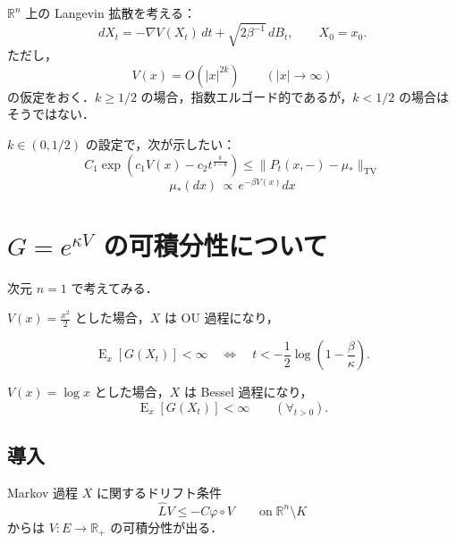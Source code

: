 \documentclass[
]{article}
\author{司馬 博文}
\date{7/05/2024}
\begin{document}
\maketitle

\(\mathbb{R}^n\) 上の Langevin 拡散を考える： \[
dX_t=-\nabla V(X_t)\,dt+\sqrt{2\beta^{-1}}\,dB_t,\qquad X_0=x_0.
\] ただし， \[
V(x)=O(\lvert x\rvert^{2k})\qquad(\lvert x\rvert\to\infty)
\] の仮定をおく．\(k\ge1/2\) の場合，指数エルゴード的であるが，\(k<1/2\)
の場合はそうではない．

\(k\in(0,1/2)\) の設定で，次が示したい： \[
C_1\exp\left(c_1V(x)-c_2t^{\frac{k}{1-k}}\right)\le\|P_t(x,-)-\mu_*\|_\mathrm{TV}
\] \[
\mu_*(dx)\,\propto\,e^{-\beta V(x)}dx
\]

\section{\texorpdfstring{\(G=e^{\kappa V}\)
の可積分性について}{G=e\^{}\{\textbackslash kappa V\} の可積分性について}}\label{gekappa-v-ux306eux53efux7a4dux5206ux6027ux306bux3064ux3044ux3066}

\begin{tcolorbox}[enhanced jigsaw, colback=white, breakable, left=2mm, arc=.35mm, colframe=quarto-callout-tip-color-frame, leftrule=.75mm, bottomrule=.15mm, rightrule=.15mm, opacityback=0, toprule=.15mm]

次元 \(n=1\) で考えてみる．

\(V(x)=\frac{x^2}{2}\) とした場合，\(X\) は OU 過程になり，

\[
\operatorname{E}_x[G(X_t)]<\infty\quad\Leftrightarrow\quad t<-\frac{1}{2}\log\left(1-\frac{\beta}{\kappa}\right).
\]

\(V(x)=\log x\) とした場合，\(X\) は Bessel 過程になり， \[
\operatorname{E}_x[G(X_t)]<\infty\qquad(\forall_{t>0}).
\]

\end{tcolorbox}

\subsection{導入}\label{ux5c0eux5165}

Markov 過程 \(X\) に関するドリフト条件 \[
\widehat{L}V\le-C\varphi\circ V\qquad\mathrm{on}\;\mathbb{R}^n\setminus K
\] からは \(V:E\to\mathbb{R}_+\) の可積分性が出る．
\end{document}
